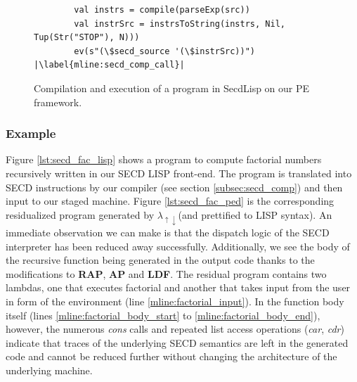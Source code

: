 \documentclass[a4paper,12pt,twoside,openright]{report}
\theoremstyle{definition}
\newcommand{\mslang}{$\lambda_{\uparrow\downarrow}$}
\newcommand{\secdlisp}{SecdLisp}
\begin{document}
\begin{figure}[htp!]
\centering
\begin{verbatim}
        val instrs = compile(parseExp(src))
        val instrSrc = instrsToString(instrs, Nil, Tup(Str("STOP"), N)))
        ev(s"(\$secd_source '(\$instrSrc))") |\label{mline:secd_comp_call}|
\end{verbatim}
\caption{Compilation and execution of a program in \secdlisp{} on our PE framework.}
\label{lst:secd_comp_ex1}
\end{figure}

\subsubsection{Example}
Figure \ref{lst:secd_fac_lisp} shows a program to compute factorial numbers recursively written in our SECD LISP front-end. The program is translated into SECD instructions by our compiler (see section \ref{subsec:secd_comp}) and then input to our staged machine. Figure \ref{lst:secd_fac_ped} is the corresponding residualized program generated by \mslang (and prettified to LISP syntax). An immediate observation we can make is that the dispatch logic of the SECD interpreter has been reduced away successfully. Additionally, we see the body of the recursive function being generated in the output code thanks to the modifications to \textbf{RAP}, \textbf{AP} and \textbf{LDF}. The residual program contains two lambdas, one that executes factorial and another that takes input from the user in form of the environment (line \ref{mline:factorial_input}). In the function body itself (lines \ref{mline:factorial_body_start} to \ref{mline:factorial_body_end}), however, the numerous \textit{cons} calls and repeated list access operations (\textit{car}, \textit{cdr}) indicate that traces of the underlying SECD semantics are left in the generated code and cannot be reduced further without changing the architecture of the underlying machine.
\end{document}

